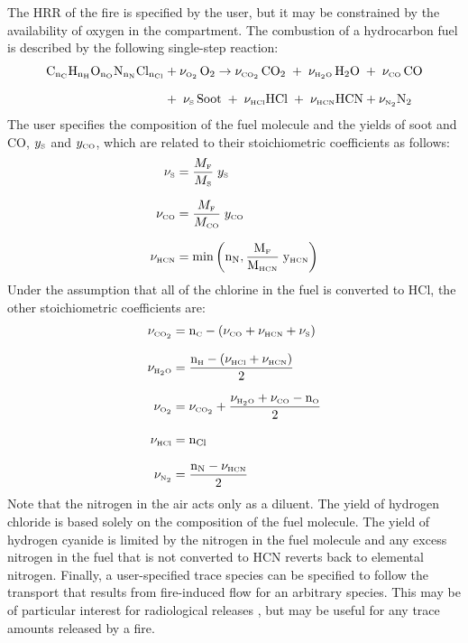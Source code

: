 \documentclass[12pt,twoside]{book}
\begin{document}
The HRR of the fire is specified by the user, but it may be constrained by the availability of oxygen in the compartment. The combustion of a hydrocarbon fuel is described by the following single-step reaction:
\begin{align}
  \mathrm{C_{n_\C}H_{n_H}O_{n_O}N_{n_N}Cl_{n_{Cl}}} &+  \nu_\OTWO \, \mathrm{O_2}  \rightarrow \nu_\COTWO \, \mathrm{CO_2} \; + \; \nu_\HTWOO \, \mathrm{H_2O} \; + \; \nu_\CO \, \mathrm{CO} \nonumber \\[.1in]
  &+ \; \nu_\So \, \mathrm{Soot} \; + \; \nu_\HCl \mathrm{HCl} \; + \; \nu_\HCN \mathrm{HCN} + \nu_\NTWO \mathrm{N}_2 \label{stoich}
\end{align}
The user specifies the composition of the fuel molecule and the yields of soot and CO, $y_\So$ and $y_\CO$, which are related to their stoichiometric coefficients as follows:
\begin{align}
  \nu_\So &= \frac{M_\F}{M_\So} \; y_\So \label{nu_s} \\[.1in]
  \nu_\CO &= \frac{M_\F}{M_\CO} \; y_\CO \label{CO_yield} \\[.1in]
  \nu_\HCN   &= \min{\left( \mathrm{n_{N},\frac{M_\F}{M_\HCN} \; y_\HCN} \right)}
\end{align}
Under the assumption that all of the chlorine in the fuel is converted to HCl, the other stoichiometric coefficients are:
\begin{align}
  \nu_\COTWO &= \mathrm{n_\C} - \left( \nu_\CO + \nu_\HCN + \nu_\So \right) \\[.1in]
  \nu_\HTWOO &= \frac{\mathrm{n_\Hy} - \left( \nu_\HCl + \nu_\HCN \right)}{2} \\[.1in]
  \nu_\OTWO  &= \nu_\COTWO + \frac{\nu_\HTWOO + \nu_\CO - \mathrm{n_\Oh}}{2} \label{Oxygen_yield} \\[.1in]
  \nu_\HCl   &= \mathrm{n_{Cl}} \\[.1in]
  \nu_\NTWO  &= \frac{\mathrm{n_N} - \nu_\HCN}{2} \label{nu_N2}
\end{align}
Note that the nitrogen in the air acts only as a diluent. The yield of hydrogen chloride is based solely on the composition of the fuel molecule. The yield of hydrogen cyanide is limited by the nitrogen in the fuel molecule and any excess nitrogen in the fuel that is not converted to HCN reverts back to elemental nitrogen. Finally, a user-specified trace species can be specified to follow the transport that results from fire-induced flow for an arbitrary species. This may be of particular interest for radiological releases \cite{Jones:2008}, but may be useful for any trace amounts released by a fire.
\end{document}
